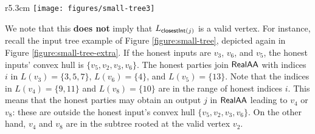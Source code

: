 \begin{wrapfigure}{r}{5.3cm}
\centering
\texttt{[image: figures/small-tree3]}
\caption{An input tree.}\label{figure:small-tree-extra}
\end{wrapfigure} 
We note that this \textbf{does not} imply that $L_{\textsf{closestInt}(j)}$ is a valid vertex.
For instance, recall the input tree example of  Figure \ref{figure:small-tree}, depicted again in Figure \ref{figure:small-tree-extra}.
If the honest inputs are $v_3$, $v_6$, and $v_5$, the honest inputs' convex hull is  $\{v_5, v_2, v_3, v_6\}$. The honest parties join $\textsf{RealAA}$ with indices $i$ in $L(v_3) = \{3, 5, 7\}$, $L(v_6) = \{4\}$, and $L(v_5) = \{13\}$. Note that the indices in $L(v_4) = \{9, 11\}$ and $L(v_8) = \{10\}$ are in the range of honest indices $i$. This means that the honest parties may obtain an output $j$ in $\textsf{RealAA}$ leading to $v_4$ or $v_8$: these are outside the honest input's convex hull $\{v_5, v_2, v_3, v_6\}$. On the other hand, $v_4$ and $v_8$ are in the subtree rooted at the valid vertex $v_2$. 



